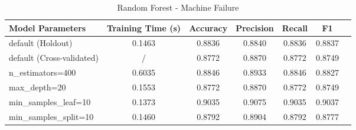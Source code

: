 \documentclass{article}
\begin{document}
\begin{table}[H]
\centering
\begin{tabular}{l|c|c|c|c|c|c}
\textbf{Model Parameters} & \textbf{Training Time (s)} & \textbf{Accuracy} & \textbf{Precision} & \textbf{Recall} & \textbf{F1} \\\hline
default (Holdout) & 0.1463  & 0.8836 & 0.8840 & 0.8836 & 0.8837 \\
default (Cross-validated) & /  & 0.8772 & 0.8870 & 0.8772 & 0.8749 \\
n\_estimators=400 & 0.6035  & 0.8846 & 0.8933 & 0.8846  & 0.8827 \\
max\_depth=20 & 0.1553  & 0.8772 & 0.8870 & 0.8772 & 0.8749 \\
min\_samples\_leaf=10 & 0.1373  & 0.9035  & 0.9075 & 0.9035  & 0.9037 \\
min\_samples\_split=10 & 0.1460  & 0.8792 & 0.8904 & 0.8792 & 0.8777 \\
\end{tabular}
\caption{Random Forest - Machine Failure}
\label{tab:Random Forest - Machine Failure}
\end{table}
\end{document}
